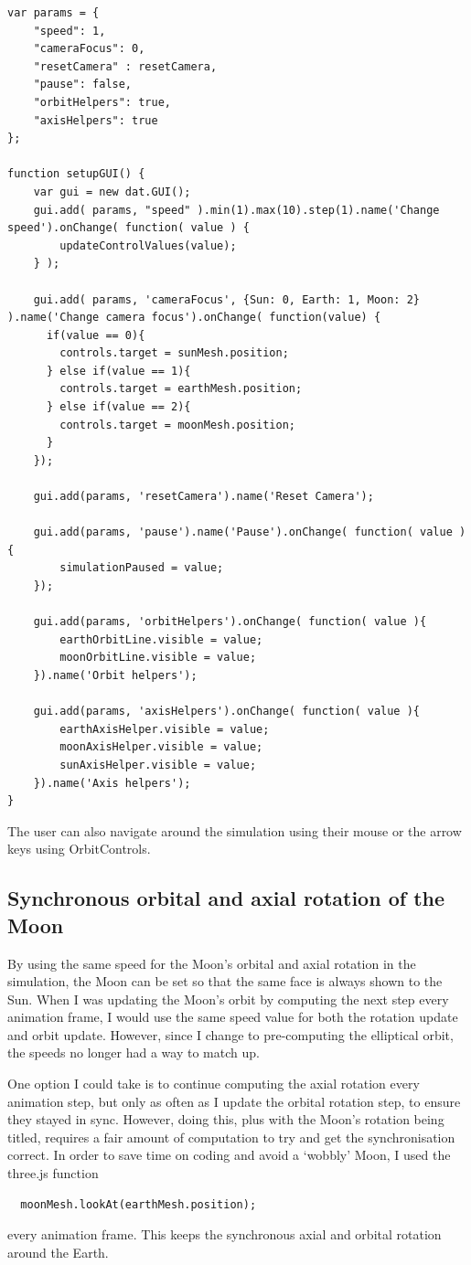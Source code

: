 \documentclass[12pt]{article}
\begin{document}
\begin{lstlisting}
var params = {
    "speed": 1,
    "cameraFocus": 0,
    "resetCamera" : resetCamera,
    "pause": false,
    "orbitHelpers": true,
    "axisHelpers": true
};

function setupGUI() {
    var gui = new dat.GUI();
    gui.add( params, "speed" ).min(1).max(10).step(1).name('Change speed').onChange( function( value ) {
        updateControlValues(value);
    } );

    gui.add( params, 'cameraFocus', {Sun: 0, Earth: 1, Moon: 2} ).name('Change camera focus').onChange( function(value) {
      if(value == 0){
        controls.target = sunMesh.position;
      } else if(value == 1){
        controls.target = earthMesh.position;
      } else if(value == 2){
        controls.target = moonMesh.position;
      }
    });

    gui.add(params, 'resetCamera').name('Reset Camera');

    gui.add(params, 'pause').name('Pause').onChange( function( value ){
        simulationPaused = value;
    });
    
    gui.add(params, 'orbitHelpers').onChange( function( value ){
        earthOrbitLine.visible = value;
        moonOrbitLine.visible = value;
    }).name('Orbit helpers');

    gui.add(params, 'axisHelpers').onChange( function( value ){
        earthAxisHelper.visible = value;
        moonAxisHelper.visible = value;
        sunAxisHelper.visible = value;
    }).name('Axis helpers');    
}
\end{lstlisting}

The user can also navigate around the simulation using their mouse or the arrow keys using OrbitControls\cite{orbitcontrols}.

\subsection{Synchronous orbital and axial rotation of the Moon}
By using the same speed for the Moon's orbital and axial rotation in the simulation, the Moon can be set so that the same face is always shown to the Sun. When I was updating the Moon's orbit by computing the next step every animation frame, I would use the same speed value for both the rotation update and orbit update. However, since I change to pre-computing the elliptical orbit, the speeds no longer had a way to match up.

One option I could take is to continue computing the axial rotation every animation step, but only as often as I update the orbital rotation step, to ensure they stayed in sync. However, doing this, plus with the Moon's rotation being titled, requires a fair amount of computation to try and get the synchronisation correct. In order to save time on coding and avoid a `wobbly' Moon, I used the three.js function 
\begin{lstlisting}
  moonMesh.lookAt(earthMesh.position);\end{lstlisting}
 every animation frame. This keeps the synchronous axial and orbital rotation around the Earth.
 
\end{document}
